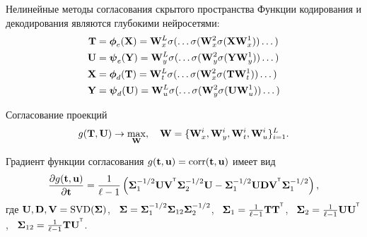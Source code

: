 \documentclass[10pt]{beamer}
\begin{document}
\begin{frame}{Нелинейные методы согласования скрытого пространства}
	Функции кодирования и декодирования являются глубокими нейросетями:
	\vspace{-0.1cm}
	\begin{align*}
		\bT &= \bphi_e(\bX) =  \bW_x^L \sigma(\dots \sigma(\bW_x^2 \sigma(\bX \bW_x^1)) \dots ) \\
		\bU &= \bpsi_e(\bY) =  \bW_y^L \sigma(\dots \sigma(\bW_y^2 \sigma(\bY \bW_y^1)) \dots ) \\
		\bX &= \bphi_d(\bT) =  \bW_t^L \sigma(\dots \sigma(\bW_x^2 \sigma(\bT \bW_t^1)) \dots ) \\
		\bY &= \bpsi_d(\bU) =  \bW_u^L \sigma(\dots \sigma(\bW_y^2 \sigma(\bU \bW_u^1)) \dots )
	\end{align*}
	\vspace{-0.4cm}
	\begin{block}{Согласование проекций}
		\vspace{-0.3cm}
		\[
			g(\bT, \bU) \rightarrow \max_{\bW}, \quad \bW = \{\bW_x^i, \bW_y^i, \bW_t^i, \bW_u^i\}_{i=1}^L.
		\]
	\end{block}	
	\vspace{-0.3cm}
		Градиент функции согласования $g(\bt, \bu) = \textnormal{corr}(\bt, \bu)$ имеет вид
		\[
			\frac{\partial g(\bt, \bu)}{\partial \bt} = \frac{1}{\ell - 1} \left(\bSigma_1^{-1/2} \bU \bV^{\T} \bSigma_2^{-1/2} \bU - \bSigma_1^{-1/2} \bU \bD \bV^{\T} \bSigma_1^{-1/2} \right),
		\]
		где $\bU, \bD, \bV = \textnormal{SVD}(\bSigma)$, \, $\bSigma = \bSigma_1^{-1/2} \bSigma_{12} \bSigma_2^{-1/2} $, \, $\bSigma_1 = \frac{1}{\ell - 1} \bT \bT^{\T}$, \, $\bSigma_2 = \frac{1}{\ell - 1} \bU \bU^{\T}$, \, $\bSigma_{12} = \frac{1}{\ell - 1} \bT \bU^{\T}$.
\end{frame}
\end{document}
